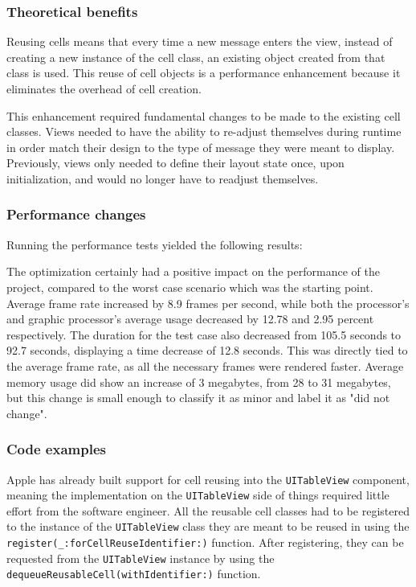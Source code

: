 \documentclass[a4paper,12pt]{article}
\begin{document}
\subsubsection*{Theoretical benefits}
Reusing cells means that every time a new message enters the view, instead of creating a new instance of the cell class, an existing object created from that class is used. This reuse of cell objects is a performance enhancement because it eliminates the overhead of cell creation.\cite{AppleCharacteristicsOfCellObjects}

This enhancement required fundamental changes to be made to the existing cell classes. Views needed to have the ability to re-adjust themselves during runtime in order match their design to the type of message they were meant to display. Previously, views only needed to define their layout state once, upon initialization, and would no longer have to readjust themselves.

\subsubsection*{Performance changes}
Running the performance tests yielded the following results:

The optimization certainly had a positive impact on the performance of the project, compared to the worst case scenario which was the starting point. Average frame rate increased by 8.9 frames per second, while both the processor's and graphic processor's average usage decreased by 12.78 and 2.95 percent respectively. The duration for the test case also decreased from 105.5 seconds to 92.7 seconds, displaying a time decrease of 12.8 seconds. This was directly tied to the average frame rate, as all the necessary frames were rendered faster. Average memory usage did show an increase of 3 megabytes, from 28 to 31 megabytes, but this change is small enough to classify it as minor and label it as "did not change".

\subsubsection*{Code examples}
Apple has already built support for cell reusing into the \texttt{UITableView} component, meaning the implementation on the \texttt{UITableView} side of things required little effort from the software engineer. All the reusable cell classes had to be registered to the instance of the \texttt{UITableView} class they are meant to be reused in using the \texttt{register(_:forCellReuseIdentifier:)} function.\cite{AppleRegisterMethod} After registering, they can be requested from the \texttt{UITableView} instance by using the \texttt{dequeueReusableCell(withIdentifier:)} function.\cite{AppleDequeueReusableCellMethod}
\end{document}
